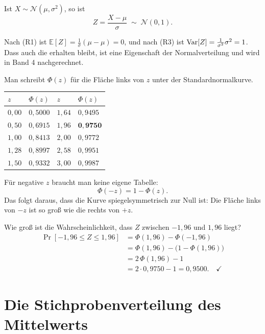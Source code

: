 \begin{merksatz}
Ist $X \sim \mathcal{N}(\mu,\sigma^2)$, so ist
\[ Z = \frac{X-\mu}{\sigma} \;\sim\; \mathcal{N}(0,1) . \]

Nach (R1) ist $\mathbb{E}[Z] = \frac{1}{\sigma}(\mu - \mu) = 0$, und nach (R3) ist $\operatorname{Var}[Z] = \frac{1}{\sigma^2}\sigma^2 = 1$. Dass auch die  erhalten bleibt, ist eine Eigenschaft der Normalverteilung und wird in Band 4 nachgerechnet.

Man schreibt $\Phi(z)$ für die Fläche links von $z$ unter der Standardnormalkurve.

\begin{center}
{\small
\renewcommand{\arraystretch}{1.38}
\begin{tabular}{@{}P{1.2cm}P{1.6cm}P{1.2cm}P{1.6cm}@{}}
\toprule
$z$ & $\Phi(z)$ & $z$ & $\Phi(z)$\\
\midrule
$0{,}00$ & $0{,}5000$ & $1{,}64$ & $0{,}9495$\\
$0{,}50$ & $0{,}6915$ & $1{,}96$ & $\mathbf{0{,}9750}$\\
$1{,}00$ & $0{,}8413$ & $2{,}00$ & $0{,}9772$\\
$1{,}28$ & $0{,}8997$ & $2{,}58$ & $0{,}9951$\\
$1{,}50$ & $0{,}9332$ & $3{,}00$ & $0{,}9987$\\
\bottomrule
\end{tabular}}
\end{center}

Für negative $z$ braucht man keine eigene Tabelle:
\[ \Phi(-z) = 1 - \Phi(z) . \]
Das folgt daraus, dass die Kurve spiegelsymmetrisch zur Null ist: Die Fläche links von $-z$ ist so groß wie die rechts von $+z$.

Wie groß ist die Wahrscheinlichkeit, dass $Z$ zwischen $-1{,}96$ und $1{,}96$ liegt?
\begin{align*}
\Pr[-1{,}96 \le Z \le 1{,}96] &= \Phi(1{,}96) - \Phi(-1{,}96)\\
&= \Phi(1{,}96) - \bigl(1 - \Phi(1{,}96)\bigr)\\
&= 2\,\Phi(1{,}96) - 1\\
&= 2 \cdot 0{,}9750 - 1 = 0{,}9500 . \quad \checkmark
\end{align*}
\end{merksatz}

\section{Die Stichprobenverteilung des Mittelwerts}

